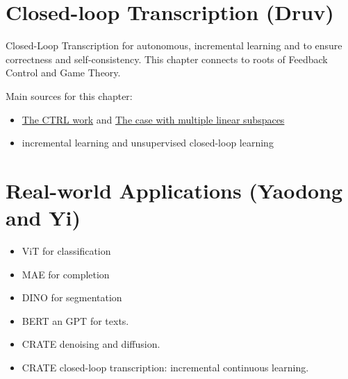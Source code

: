 \documentclass{article}
\begin{document}
\section{Closed-loop Transcription (Druv)} Closed-Loop Transcription for autonomous, incremental learning and to ensure correctness and self-consistency. This chapter connects to roots of Feedback Control and Game Theory. 

Main sources for this chapter:
\begin{itemize}
\item \href{https://www.mdpi.com/1099-4300/24/4/456/htm}{The CTRL work} and \href{https://arxiv.org/abs/2206.09120}{The case with multiple linear subspaces}
\item incremental learning and unsupervised closed-loop learning

\end{itemize}

\section{Real-world Applications (Yaodong and Yi)}

\begin{itemize}
    \item ViT for classification
    \item MAE for completion
    \item DINO for segmentation
    \item BERT an GPT for texts.
    \item CRATE denoising and diffusion.
    \item CRATE closed-loop transcription: incremental continuous learning.
\end{itemize}
\end{document}
